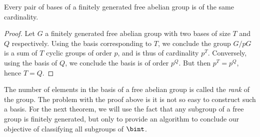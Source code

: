 \begin{corollary}
    Every pair of bases of a finitely generated free abelian group is of the same cardinality.
\end{corollary}
\begin{proof}
    Let $G$ a finitely generated free abelian group with two bases of size $T$ and $Q$ respectively. Using the basis corresponding to $T$, we conclude the group $G/pG$ is a sum of $T$ cyclic groups of order $p$, and is thus of cardinality $p^T$. Conversely, using the basis of $Q$, we conclude the basis is of order $p^Q$. But then $p^T = p^Q$, hence $T = Q$.
\end{proof}

The number of elements in the basis of a free abelian group is called the \emph{rank} of the group. The problem with the proof above is it is not so easy to construct such a basis. For the next theorem, we will use the fact that any subgroup of a free group is finitely generated, but only to provide an algorithm to conclude our objective of classifying all subgroups of $\bint$.

